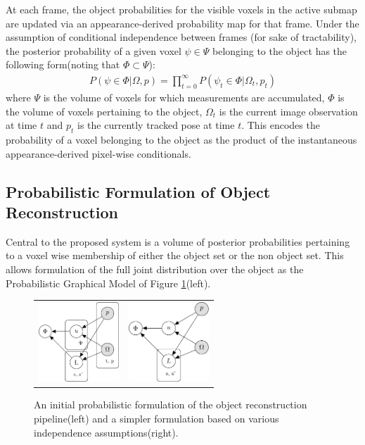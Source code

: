 At each frame, the object probabilities for the visible voxels in the active submap are updated via an appearance-derived probability map for that frame. Under the assumption of conditional independence between frames (for sake of tractability), the posterior probability of a given voxel $\psi \in \Psi$ belonging to the object has the following form(noting that $\Phi \subset \Psi$):
\begin{equation}
\label{eq:membership}
\begin{split}
P(\psi \in \Phi | \Omega, p) = \prod_{t=0}^{\infty} P(\psi_{t} \in \Phi | \Omega_{t}, p_{t})
\end{split}
\end{equation}
where $\Psi$ is the volume of voxels for which measurements are accumulated, $\Phi$ 
is the volume of voxels pertaining to the object, $\Omega_{t}$ is the current image observation at time $t$ and $p_{t}$ is the 
currently tracked pose at time $t$.
This encodes the probability of a voxel belonging to the object as the product of the instantaneous appearance-derived pixel-wise conditionals.

\subsection{Probabilistic Formulation of Object Reconstruction}
Central to the proposed system is a volume of posterior probabilities pertaining to a voxel wise membership of either the 
object set or the non object set. This allows formulation of the full joint distribution over the object as the Probabilistic 
Graphical Model of Figure \ref{fig:pgm}(left).

\begin{figure}[!t]
	\centering
	\begin{tabular}{cc}
		\includegraphics[height=3cm]{graphical_models/pgm1.pdf}&
		\includegraphics[height=3cm]{graphical_models/pgm2.pdf}
		\vspace{-3mm}
	\end{tabular}
	\caption{An initial probabilistic formulation of the object reconstruction pipeline(left) and a simpler formulation based on various independence assumptions(right).}
	\label{fig:pgm}
\end{figure}

